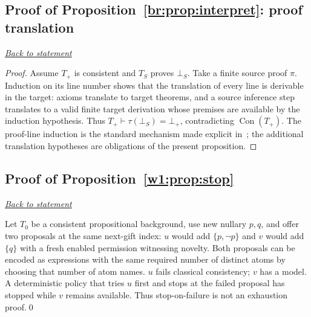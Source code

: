 \documentclass[11pt,letterpaper]{article}
\theoremstyle{definition}\newtheorem{definition}[theorem]{Definition}\newtheorem{example}[theorem]{Example}
\theoremstyle{remark}\newtheorem{remark}[theorem]{Remark}
\newcommand{\Con}{\operatorname{Con}}
\newcommand{\backlink}[1]{\noindent\hyperref[#1]{\textit{Back to statement}}\par\smallskip}
\begin{document}
\subsection{Proof of Proposition~\ref{br:prop:interpret}: proof translation}\label{br:pr:interpret}
\backlink{br:prop:interpret}
\begin{proof}
Assume $T_+$ is consistent and $T_S$ proves $\bot_S$. Take a finite
source proof $\pi$. Induction on its line number shows that the
translation of every line is derivable in the target: axioms translate
to target theorems, and a source inference step translates to a valid
finite target derivation whose premises are available by the induction
hypothesis. Thus $T_+\vdash\tau(\bot_S)=\bot_+$, contradicting
$\Con(T_+)$.  The proof-line induction is the standard mechanism
made explicit in~\cite[Theorem~1.10]{depthsv2}; the additional
translation hypotheses are obligations of the present proposition.
\end{proof}


\subsection{Proof of Proposition~\ref{w1:prop:stop}}\label{w1:pr:stop}\backlink{w1:prop:stop}
Let $T_0$ be a consistent propositional background, use new nullary $p,q$, and offer two proposals at the same next-gift index: $u$ would add $\{p,\neg p\}$ and $v$ would add $\{q\}$ with a fresh enabled permission witnessing novelty. Both proposals can be encoded as expressions with the same required number of distinct atoms by choosing that number of atom names. $u$ fails classical consistency; $v$ has a model. A deterministic policy that tries $u$ first and stops at the failed proposal has stopped while $v$ remains available. Thus stop-on-failure is not an exhaustion proof.\qed
\end{document}
